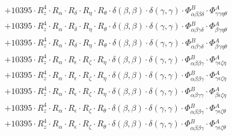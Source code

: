 \documentclass{article}
\begin{document}
\begin{subequations}
\begin{gather}
\begin{array}{c}
 \\[0.2em] 		 + 10395 \cdot R_{z}^{4} \cdot R_{\alpha{}} \cdot R_{\delta{}} \cdot R_{\eta{}} \cdot R_{\theta{}} \cdot \delta{}\left(\beta{}, \beta{}\right) \cdot \delta{}\left(\gamma{}, \gamma{}\right) \cdot \Phi{}^{B}_{\alpha{}\beta{}\beta{}\delta{}} \cdot \Phi{}^{A}_{\gamma{}\gamma{}\eta{}\theta{}} 
 \\[0.2em] 		 + 10395 \cdot R_{z}^{4} \cdot R_{\alpha{}} \cdot R_{\delta{}} \cdot R_{\eta{}} \cdot R_{\theta{}} \cdot \delta{}\left(\beta{}, \beta{}\right) \cdot \delta{}\left(\gamma{}, \gamma{}\right) \cdot \Phi{}^{B}_{\alpha{}\beta{}\gamma{}\delta{}} \cdot \Phi{}^{A}_{\beta{}\gamma{}\eta{}\theta{}} 
 \\[0.2em] 		 + 10395 \cdot R_{z}^{4} \cdot R_{\alpha{}} \cdot R_{\delta{}} \cdot R_{\eta{}} \cdot R_{\theta{}} \cdot \delta{}\left(\beta{}, \beta{}\right) \cdot \delta{}\left(\gamma{}, \gamma{}\right) \cdot \Phi{}^{B}_{\alpha{}\beta{}\gamma{}\delta{}} \cdot \Phi{}^{A}_{\beta{}\gamma{}\eta{}\theta{}} 
 \\[0.2em] 		 + 10395 \cdot R_{z}^{4} \cdot R_{\alpha{}} \cdot R_{\epsilon{}} \cdot R_{\zeta{}} \cdot R_{\eta{}} \cdot \delta{}\left(\beta{}, \beta{}\right) \cdot \delta{}\left(\gamma{}, \gamma{}\right) \cdot \Phi{}^{B}_{\alpha{}\beta{}\beta{}\gamma{}} \cdot \Phi{}^{A}_{\gamma{}\epsilon{}\zeta{}\eta{}} 
 \\[0.2em] 		 + 10395 \cdot R_{z}^{4} \cdot R_{\alpha{}} \cdot R_{\epsilon{}} \cdot R_{\zeta{}} \cdot R_{\eta{}} \cdot \delta{}\left(\beta{}, \beta{}\right) \cdot \delta{}\left(\gamma{}, \gamma{}\right) \cdot \Phi{}^{B}_{\alpha{}\beta{}\beta{}\gamma{}} \cdot \Phi{}^{A}_{\gamma{}\epsilon{}\zeta{}\eta{}} 
 \\[0.2em] 		 + 10395 \cdot R_{z}^{4} \cdot R_{\alpha{}} \cdot R_{\epsilon{}} \cdot R_{\zeta{}} \cdot R_{\eta{}} \cdot \delta{}\left(\beta{}, \beta{}\right) \cdot \delta{}\left(\gamma{}, \gamma{}\right) \cdot \Phi{}^{B}_{\alpha{}\beta{}\gamma{}\gamma{}} \cdot \Phi{}^{A}_{\beta{}\epsilon{}\zeta{}\eta{}} 
 \\[0.2em] 		 + 10395 \cdot R_{z}^{4} \cdot R_{\alpha{}} \cdot R_{\epsilon{}} \cdot R_{\zeta{}} \cdot R_{\theta{}} \cdot \delta{}\left(\beta{}, \beta{}\right) \cdot \delta{}\left(\gamma{}, \gamma{}\right) \cdot \Phi{}^{B}_{\alpha{}\beta{}\beta{}\gamma{}} \cdot \Phi{}^{A}_{\gamma{}\epsilon{}\zeta{}\theta{}} 
 \\[0.2em] 		 + 10395 \cdot R_{z}^{4} \cdot R_{\alpha{}} \cdot R_{\epsilon{}} \cdot R_{\zeta{}} \cdot R_{\theta{}} \cdot \delta{}\left(\beta{}, \beta{}\right) \cdot \delta{}\left(\gamma{}, \gamma{}\right) \cdot \Phi{}^{B}_{\alpha{}\beta{}\beta{}\gamma{}} \cdot \Phi{}^{A}_{\gamma{}\epsilon{}\zeta{}\theta{}} 

\end{array}
\end{gather}
\end{subequations}
\end{document}
